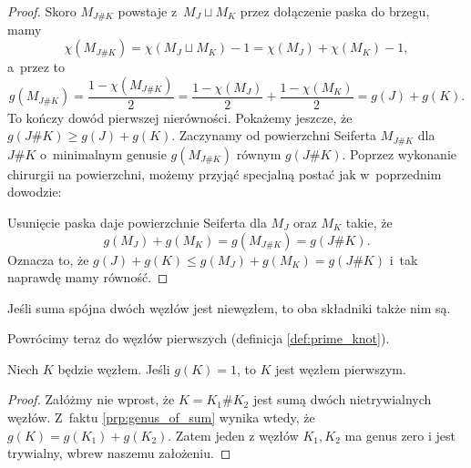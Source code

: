 \begin{proof}
    Skoro $M_{J\#K}$ powstaje z~$M_J \sqcup M_K$ przez dołączenie paska do brzegu, mamy
    \begin{equation}
        \chi(M_{J\#K}) = \chi(M_J \sqcup M_K) - 1 = \chi(M_J) + \chi(M_K)-1,
    \end{equation}
    a~przez to
    \begin{equation}
        g(M_{J\#K}) = \frac{1-\chi(M_{J\#K})}{2} =
        \frac{1-\chi(M_{J})}{2} + \frac{1-\chi(M_{K})}{2}
        = g(J) + g(K).
    \end{equation}
    To kończy dowód pierwszej nierówności.
    Pokażemy jeszcze, że $g(J \# K) \ge g(J)+g(K)$.
    Zaczynamy od powierzchni Seiferta $M_{J\#K}$ dla $J\#K$ o~minimalnym genusie $g(M_{J\#K})$ równym $g(J\#K)$.
    Poprzez wykonanie chirurgii na powierzchni, możemy przyjąć specjalną postać jak w~poprzednim dowodzie:
\begin{comment}
    \[
        \begin{tikzpicture}[baseline=-0.65ex,scale=0.16]
            \fill[blue!10!white] (-5, -5) rectangle(5, 5);
        \draw[semithick,fill=white] (-5, -5) to [out=right, in=left] (-2, -2) -- (2, -2) to [out=right, in=left] (5, -5);
        \draw[semithick,fill=white] (-5,  5) to [out=right, in=left] (-2,  2) -- (2,  2) to [out=right, in=left] (5,  5);
            \node at (0, 0) {$M_{J \# K}$};
        \end{tikzpicture}
    \]
\end{comment}

    Usunięcie paska daje powierzchnie Seiferta dla $M_J$ oraz $M_K$ takie, że
    \[
        g(M_J)+g(M_K)=g(M_{J\#K})=g(J\#K).
    \]
    Oznacza to, że $g(J)+g(K)\leqslant g(M_J)+g(M_K)=g(J\#K)$ i~tak naprawdę mamy równość.
\end{proof}

\begin{corollary}
    \label{cor:connected_sum_no_inverses}
    Jeśli suma spójna dwóch węzłów jest niewęzłem, to oba składniki także nim są.
\end{corollary}

Powrócimy teraz do węzłów pierwszych (definicja \ref{def:prime_knot}).
%

\begin{proposition}
    Niech $K$ będzie węzłem.
    Jeśli $g(K) = 1$, to $K$ jest węzłem pierwszym.
\end{proposition}

\begin{proof}
    Załóżmy nie wprost, że $K = K_1 \# K_2$ jest sumą dwóch nietrywialnych węzłów.
    Z~faktu \ref{prp:genus_of_sum} wynika wtedy, że $g(K) = g(K_1) + g(K_2)$.
    Zatem jeden z węzłów $K_1, K_2$ ma genus zero i jest trywialny, wbrew naszemu założeniu.
\end{proof}

